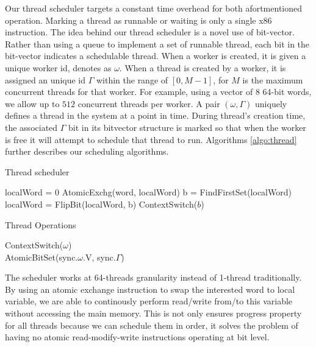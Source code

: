 \documentclass{sig-alternate-05-2015}
\begin{document}
Our thread scheduler targets a constant time overhead for both afortmentioned
operation. Marking a thread as runnable or waiting is only a single x86
instruction. The idea behind our thread scheduler is a novel use of bit-vector.
Rather than using a queue to implement a set of runnable thread, each bit in
the bit-vector indicates a schedulable thread. When a worker is created, it is
given a unique worker id, denotes as $\omega$.  When a thread is created by a
worker, it is assigned an unique id $\Gamma$ within the range of $[0,M-1]$, for
$M$ is the maximum concurrent threads for that worker.  For example, using a
vector of $8$ 64-bit words, we allow up to $512$ concurrent threads per worker.
A pair $(\omega, \Gamma)$ uniquely defines a thread in the system at a point in
time. During thread's creation time, the associated $\Gamma$ bit in its
bitvector structure is marked so that when the worker is free it will attempt
to schedule that thread to run. Algorithms \ref{algo:thread} further describes
our scheduling algorithms. 

\begin{algorithm}
  \caption{Thread scheduler}
  \label{algo:thread}
  \begin{algorithmic}[1]
     
     
        \State localWord = 0
        \State AtomicExchg(word, localWord)
          \State b = FindFirstSet(localWord)
          \State localWord = FlipBit(localWord, b)
          \State ContextSwitch($b$)
        \EndWhile
      \EndIf
      \EndFor
    \EndWhile
    \EndProcedure
  \end{algorithmic}
\end{algorithm}

\begin{algorithm}
  \caption{Thread Operations}
  \label{algo:thread-ops}
  \begin{algorithmic}[1]
      \State ContextSwitch($\omega$)
    \EndProcedure
    \\ 
      \State AtomicBitSet(sync.$\omega$.V, sync.$\Gamma$)
    \EndProcedure
  \end{algorithmic}
\end{algorithm}

The scheduler works at 64-threads granularity instead of 1-thread traditionally.
By using an atomic exchange instruction to swap the interested word to local variable, we
are able to continously perform read/write from/to this variable without
accessing the main memory. This is not only ensures progress property for all
threads because we can schedule them in order, it solves the problem of having
no atomic read-modify-write instructions operating at bit level.
\end{document}
